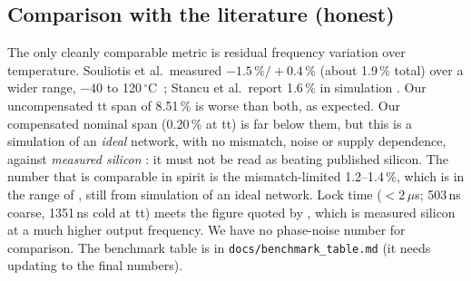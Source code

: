 \documentclass[11pt,a4paper]{article}
\newcommand{\degC}{\,$^\circ$C}
\begin{document}
\subsection{Comparison with the literature (honest)}
The only cleanly comparable metric is residual frequency variation over temperature. Souliotis et al.\ measured $-1.5\,\%/+0.4\,\%$ (about 1.9\,\% total) over a wider range, $-40$ to 120\degC\ \cite{souliotis22}; Stancu et al.\ report 1.6\,\% in simulation \cite{stancu23}. Our uncompensated tt span of 8.51\,\% is worse than both, as expected. Our compensated nominal span (0.20\,\% at tt) is far below them, but this is a simulation of an \emph{ideal} network, with no mismatch, noise or supply dependence, against \emph{measured silicon} \cite{souliotis22}: it must not be read as beating published silicon. The number that is comparable in spirit is the mismatch-limited 1.2--1.4\,\%, which is in the range of \cite{souliotis22,stancu23}, still from simulation of an ideal network. Lock time ($<2\,\mu$s; 503\,ns coarse, 1351\,ns cold at tt) meets the figure quoted by \cite{geng18}, which is measured silicon at a much higher output frequency. We have no phase-noise number for comparison. The benchmark table is in \texttt{docs/benchmark\_table.md} (it needs updating to the final numbers).
\end{document}
